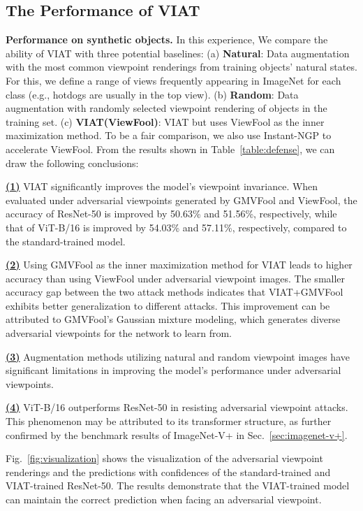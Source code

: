 \documentclass[10pt,journal,compsoc]{IEEEtran}
\begin{document}
\subsection{The Performance of VIAT} \label{sec:4.3}
\textbf{Performance on synthetic objects.} In this experience, We compare the ability of VIAT with three potential baselines: (a) \textbf{Natural}: Data augmentation with the most common viewpoint renderings from training objects’ natural states. For this, we define a range of views frequently appearing in ImageNet for each class (e.g., hotdogs are usually in the top view). (b)  \textbf{Random}: Data augmentation with randomly selected viewpoint rendering of objects in the training set. (c) \textbf{VIAT(ViewFool)}: VIAT but uses ViewFool as the inner maximization method. To be a fair comparison, we also use Instant-NGP to accelerate ViewFool. From the results shown in Table~\ref{table:defense}, we can draw the following conclusions: 

\textbf{\underline{(1)}}
VIAT significantly improves the model's viewpoint invariance. When evaluated under adversarial viewpoints generated by GMVFool and ViewFool, the accuracy of ResNet-50 is improved by 50.63\% and 51.56\%, respectively, while that of ViT-B/16 is improved by 54.03\% and 57.11\%, respectively, compared to the standard-trained model.

\textbf{\underline{(2)}}
Using GMVFool as the inner maximization method for VIAT leads to higher accuracy than using ViewFool under adversarial viewpoint images. The smaller accuracy gap between the two attack methods indicates that VIAT+GMVFool exhibits better generalization to different attacks. This improvement can be attributed to GMVFool's Gaussian mixture modeling, which generates diverse adversarial viewpoints for the network to learn from.

\textbf{\underline{(3)}}
Augmentation methods utilizing natural and random viewpoint images have significant limitations in improving the model's performance under adversarial viewpoints.

\textbf{\underline{(4)}}
ViT-B/16 outperforms ResNet-50 in resisting adversarial viewpoint attacks. This phenomenon may be attributed to its transformer structure, as further confirmed by the benchmark results of ImageNet-V+ in Sec.~\ref{sec:imagenet-v+}.

Fig.~\ref{fig:visualization} shows the visualization of the adversarial viewpoint renderings and the predictions with confidences of the standard-trained and VIAT-trained ResNet-50. The results demonstrate that the VIAT-trained model can maintain the correct prediction when facing an adversarial viewpoint.
\end{document}
